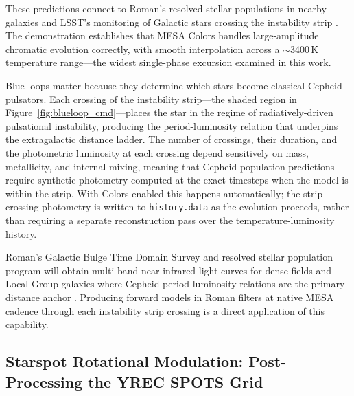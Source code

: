 \documentclass[linenumbers,apj,twocolumn, floatfix]{aastex701}
\begin{document}
These predictions connect to Roman's resolved stellar populations in nearby galaxies \citep{roman} and LSST's monitoring of Galactic stars crossing the instability strip \citep{LSST}.
The demonstration establishes that MESA Colors handles large-amplitude chromatic evolution correctly, with smooth interpolation across a $\sim$3400\,K temperature range---the widest single-phase excursion examined in this work.

Blue loops matter because they determine which stars become classical Cepheid pulsators.
Each crossing of the instability strip—the shaded region in Figure~\ref{fig:blueloop_cmd}—places the star in the regime of radiatively-driven pulsational instability, producing the period-luminosity relation that underpins the extragalactic distance ladder.
The number of crossings, their duration, and the photometric luminosity at each crossing depend sensitively on mass, metallicity, and internal mixing, meaning that Cepheid population predictions require synthetic photometry computed at the exact timesteps when the model is within the strip.
With Colors enabled this happens automatically; the strip-crossing photometry is written to \texttt{history.data} as the evolution proceeds, rather than requiring a separate reconstruction pass over the temperature-luminosity history.

Roman's Galactic Bulge Time Domain Survey and resolved stellar population program will obtain multi-band near-infrared light curves for dense fields and Local Group galaxies where Cepheid period-luminosity relations are the primary distance anchor \citep{roman}.
Producing forward models in Roman filters at native MESA cadence through each instability strip crossing is a direct application of this capability.

\subsection{Starspot Rotational Modulation: Post-Processing the YREC SPOTS Grid}
\label{sec:demo_yrec}
\end{document}
